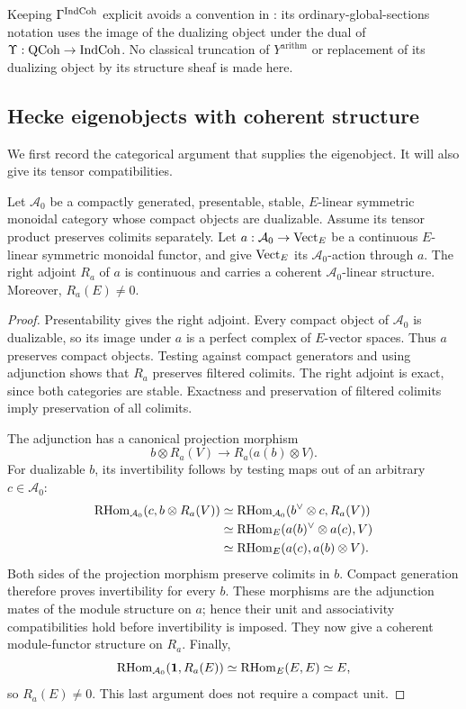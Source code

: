 Keeping \(\Gamma^{\operatorname{IndCoh}}\) explicit avoids a convention in
\cite[\S1.5.3]{GR}: its ordinary-global-sections notation uses the image
of the dualizing object under the dual of
\(\Upsilon:\operatorname{QCoh}\to\operatorname{IndCoh}\).
No classical truncation of \(Y^{\mathrm{arithm}}\) or replacement of its
dualizing object by its structure sheaf is made here.

\subsection{Hecke eigenobjects with coherent structure}

We first record the categorical argument that supplies the eigenobject.
It will also give its tensor compatibilities.

\begin{lemma}\label{lem:parameter-adjoint}
Let \(\mathcal A_0\) be a compactly generated, presentable, stable,
\(E\)-linear symmetric monoidal category whose compact objects are
dualizable.  Assume its tensor product preserves colimits separately.
Let \(a:\mathcal A_0\to\operatorname{Vect}_E\) be a continuous \(E\)-linear symmetric monoidal
functor, and give \(\operatorname{Vect}_E\) its \(\mathcal A_0\)-action through \(a\).
The right adjoint \(R_a\) of \(a\) is continuous and carries a coherent
\(\mathcal A_0\)-linear structure.  Moreover, \(R_a(E)\ne0\).
\end{lemma}
\begin{proof}
Presentability gives the right adjoint.  Every compact object of
\(\mathcal A_0\) is dualizable, so its image under \(a\) is a perfect
complex of \(E\)-vector spaces.  Thus \(a\) preserves compact objects.
Testing against compact generators and using adjunction shows that
\(R_a\) preserves filtered colimits.  The right adjoint is exact, since
both categories are stable.  Exactness and preservation of filtered
colimits imply preservation of all colimits.

The adjunction has a canonical projection morphism
\[
 b\otimes R_a(V)\longrightarrow R_a\bigl(a(b)\otimes V\bigr).
\]
For dualizable \(b\), its invertibility follows by testing maps out of
an arbitrary \(c\in\mathcal A_0\):
\begin{align*}
 \operatorname{RHom}_{\mathcal A_0}(c,b\otimes R_a(V))
 &\simeq\operatorname{RHom}_{\mathcal A_0}(b^\vee\otimes c,R_a(V))\\
 &\simeq\operatorname{RHom}_E(a(b)^\vee\otimes a(c),V)\\
 &\simeq\operatorname{RHom}_E(a(c),a(b)\otimes V).
\end{align*}
Both sides of the projection morphism preserve colimits in \(b\).
Compact generation therefore proves invertibility for every \(b\).
These morphisms are the adjunction mates of the module structure on
\(a\); hence their unit and associativity compatibilities hold before
invertibility is imposed.  They now give a coherent module-functor
structure on \(R_a\).
Finally,
\[
 \operatorname{RHom}_{\mathcal A_0}(\mathbf1,R_a(E))
 \simeq\operatorname{RHom}_E(E,E)\simeq E,
\]
so \(R_a(E)\ne0\).  This last argument does not require a compact unit.
\end{proof}


